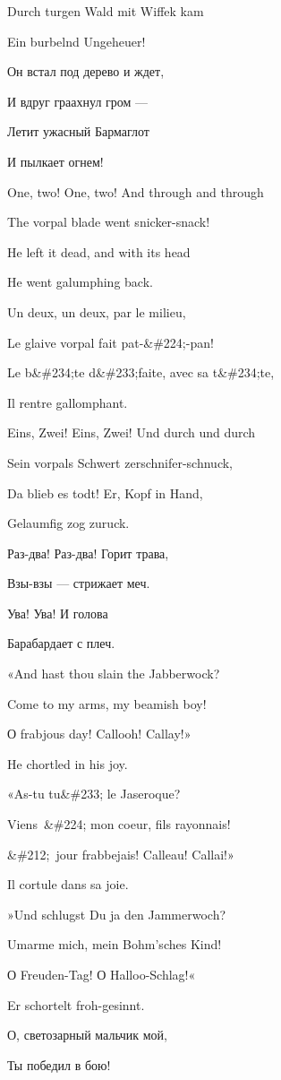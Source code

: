 Durch turgen Wald mit Wiffek kam

Ein burbelnd Ungeheuer!

Он встал под дерево и ждет,

И вдруг граахнул гром ---

Летит ужасный Бармаглот

И пылкает огнем!

One, two! One, two! And through and through

The vorpal blade went snicker-snack!

He left it dead, and with its head

He went galumphing back.

Un deux, un deux, par le milieu,

Le glaive vorpal fait pat-\&\#224;-pan!

Le b\&\#234;te d\&\#233;faite, avec sa t\&\#234;te,

Il rentre gallomphant.

Eins, Zwei! Eins, Zwei! Und durch und durch

Sein vorpals Schwert zerschnifer-schnuck,

Da blieb es todt! Er, Kopf in Hand,

Gelaumfig zog zuruck.

Раз-два! Раз-два! Горит трава,

Взы-взы --- стрижает меч.

Ува! Ува! И голова

Барабардает с плеч.

«And hast thou slain the Jabberwock?

Come to my arms, my beamish boy!

О frabjous day! Callooh! Callay!»

He chortled in his joy.

«As-tu tu\&\#233; le Jaseroque?

Viens~\&\#224; mon coeur, fils rayonnais!

\&\#212;~jour frabbejais! Calleau! Callai!»

Il cortule dans sa joie.

»Und schlugst Du ja den Jammerwoch?

Umarme mich, mein Bohm'sches Kind!

О Freuden-Tag! О Halloo-Schlag!«

Er schortelt froh-gesinnt.

О, светозарный мальчик мой,

Ты победил в бою!

